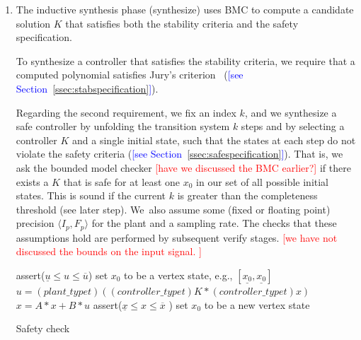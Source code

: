 \documentclass[twocolumn]{autart}    %
\renewcommand{\note}[1]{\textcolor{red}{[#1]}}
\newcommand{\reply}[1]{\textcolor{blue}{[#1]}}
\begin{document}
\begin{enumerate}

\item The inductive synthesis phase ({\sc synthesize}) uses BMC to compute a
candidate solution $K$ that satisfies both the stability criteria and the
safety specification.  

To synthesize a controller that satisfies the
stability criteria, we require that a computed polynomial satisfies Jury's
criterion~\cite{fadali} (\reply{see Section~\ref{ssec:stabspecification}}).

Regarding the second requirement, 
we fix an index $k$, 
and we synthesize a safe controller by
unfolding the transition system $k$ steps and by selecting a controller $K$ and a single initial state, 
such that the states at each step do not violate the safety criteria (\reply{see Section~\ref{ssec:safespecification}}).  
That is, we ask the bounded model checker \note{have we discussed the BMC earlier?} if there exists a $K$ that is safe for at least one $x_0$ in our set of all possible initial states.  
This is sound if the current $k$ is greater than the completeness threshold (see later step).  
We~also assume some (fixed or floating point) precision $\langle I_p,F_p\rangle$ for the plant and a sampling rate.  
The checks that these assumptions hold are performed by subsequent {\sc verify} stages. 
\note{we have not discussed the bounds on the input signal. }



\begin{algorithm}[]
\begin{algorithmic}[1]
\State assert($ \underline{u}  \leq u \leq \overline{u}$)
 \State set $x_0$ to be a vertex state, e.g., $[\underline{x_0},\underline{x_0}]$	
		\State $u = (plant\_typet)((controller\_typet)K * (controller\_typet) x)$
		\State $x = A * x + B * u$
		\State assert($\underline{x} \leq x \leq \overline{x}$ )
  	\EndFor
  	\State set $x_0$ to be a new vertex state
  	\EndFor
\EndFunction
\end{algorithmic}
\caption{Safety check\label{alg:safetycheck}}
\end{algorithm}


\end{enumerate}
\end{document}
